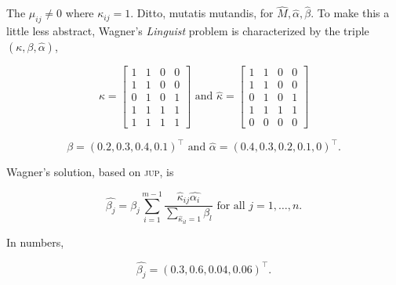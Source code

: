 \documentclass[phd,12pt,oneside]{ubcthesis}
\begin{document}
{\noindent}The $\mu_{ij}\neq{}0$ where $\kappa_{ij}=1$. Ditto, mutatis mutandis,
for $\hat{M},\hat{\alpha},\hat{\beta}$. To make this a little less
abstract, Wagner's \emph{Linguist} problem is characterized by the
triple $(\kappa,\beta,\hat{\alpha})$,

\begin{equation}
  \label{eq:m4}
  \kappa=\left[
  \begin{array}{cccc}
    1 & 1 & 0 & 0 \\
    1 & 1 & 0 & 0 \\
    0 & 1 & 0 & 1 \\
    1 & 1 & 1 & 1 \\
    1 & 1 & 1 & 1
  \end{array}
\right]\mbox{ and }
  \hat{\kappa}=\left[
  \begin{array}{cccc}
    1 & 1 & 0 & 0 \\
    1 & 1 & 0 & 0 \\
    0 & 1 & 0 & 1 \\
    1 & 1 & 1 & 1 \\
    0 & 0 & 0 & 0
  \end{array}
\right]
\end{equation}

\begin{equation}
  \label{eq:m5}
  \beta=(0.2,0.3,0.4,0.1)^{\top}\mbox{ and }\hat{\alpha}=(0.4,0.3,0.2,0.1,0)^{\top}.
\end{equation}

{\noindent}Wagner's solution, based on \textsc{jup}, is

\begin{equation}
  \label{eq:m6}
  \hat{\beta_{j}}=\beta_{j}\sum_{i=1}^{m-1}\frac{\hat{\kappa}_{ij}\hat{\alpha_{i}}}{\sum_{\hat{\kappa}_{il}=1}\beta_{l}}\mbox{ for all }j=1,\ldots,n.
\end{equation}

{\noindent}In numbers,

\begin{equation}
  \label{eq:m7}
  \hat{\beta_{j}}=(0.3,0.6,0.04,0.06)^{\top}.
\end{equation}
\end{document}
